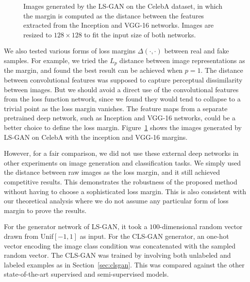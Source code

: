 \documentclass[11pt,fullpage, letterpaper,twoside]{article}
\newcommand{\1}[1]{\mathds{1}_{\left[#1\right]}}
\begin{document}
\begin{figure}[t]
\centering
{}
\caption{Images generated by the LS-GAN on the CelebA dataset, in which the margin is computed as the distance between the features extracted from the Inception and VGG-16 networks. Images are resized to $128\times 128$ to fit the input size of both networks.}\label{fig:inception_vgg}
\end{figure}

We also tested various forms of loss margins $\Delta(\cdot,\cdot)$ between real and fake samples.
For example, we tried the $L_p$ distance between image representations as the margin, and found the best result can be achieved when $p=1$.
The distance between convolutional features was supposed to capture perceptual dissimilarity between images.
But we should avoid a direct use of the convolutional features from the loss function network, since we found they would tend to collapse to a trivial point as the loss margin vanishes.
The feature maps from a separate pretrained deep network, such as Inception and VGG-16 networks, could be a better choice to define the loss margin. Figure~\ref{fig:inception_vgg} shows the images generated by LS-GAN on CelebA with the inception and VGG-16 margins.

However, for a fair comparison, we did not use these external deep networks in other experiments on image generation and classification tasks. We simply used the distance between raw images as the loss margin, and it still achieved competitive results. This demonstrates the robustness of the proposed method without having to choose a sophisticated loss margin. This is also consistent with our theoretical analysis where we do not assume any particular form of loss margin to prove the results.



For the generator network of LS-GAN, it took a $100$-dimensional random vector drawn from Unif$[-1,1]$ as input. For the
CLS-GAN generator, an one-hot vector encoding the image class condition was concatenated with the sampled random vector. The CLS-GAN was trained by involving both unlabeled and labeled examples as in Section~\ref{sec:clsgan}. This was compared against the other state-of-the-art supervised and semi-supervised models.
\end{document}
